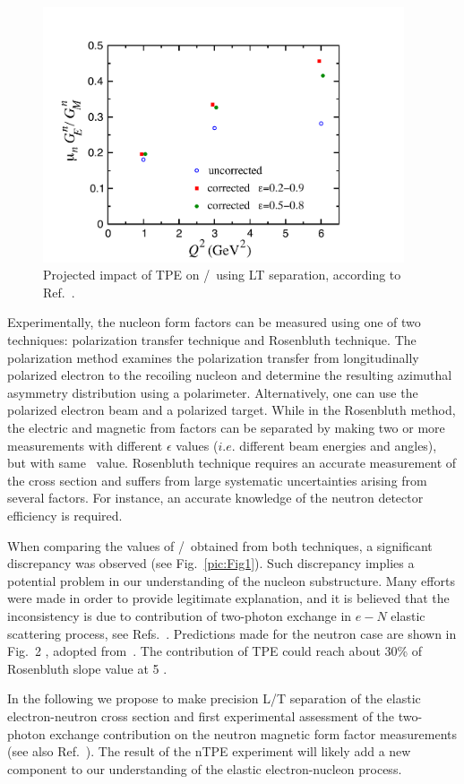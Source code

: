 \begin{figure}[th]
\includegraphics[width = 0.95\textwidth]{Plots/nTPE-BMT.pdf}
\caption{Projected impact of TPE on \gen/\gmn~using LT separation, according to Ref.~\cite{Blunden:2005ew}.}
\label{pic:Fig2}
\end{figure}
 
Experimentally, the nucleon form factors can be measured using one of two techniques: polarization transfer technique and Rosenbluth technique. 
The polarization method examines the polarization transfer from longitudinally polarized electron to the recoiling nucleon and 
determine the resulting azimuthal asymmetry distribution using a polarimeter. 
Alternatively, one can use the polarized  electron beam and a polarized target. 
While in the Rosenbluth method, the electric and magnetic from factors can be separated by making two or more measurements with 
different $\epsilon$ values ($i.e.$ different beam energies and angles), but with same \qsq~value. 
Rosenbluth technique requires an accurate measurement of the cross section and suffers from large systematic uncertainties arising from several factors. 
For instance, an accurate knowledge of the neutron detector efficiency is required.

When comparing the values of \gep/\gmp~obtained from both techniques, a significant discrepancy was observed (see Fig.~\ref{pic:Fig1}). 
Such discrepancy implies a potential problem in our understanding of the nucleon substructure. 
Many efforts were made in order to provide legitimate explanation, and it is believed that the inconsistency is due to contribution of two-photon exchange
in $e-N$ elastic scattering process, see Refs.~\cite{Arrington:2011dn, Afanasev:2017gsk}.
Predictions made for the neutron case are shown in Fig.~2
, adopted from~\cite{Blunden:2005ew}.
The contribution of TPE could reach about 30\% of Rosenbluth slope value at 5 \gevcsq.

In the following we propose to make precision L/T separation of the elastic electron-neutron cross section and first experimental assessment 
of the two-photon exchange contribution on the neutron magnetic form factor measurements (see also Ref.~\cite{Wojtsekhowski:2017kti}).
The result of the nTPE experiment will likely add a new component to our understanding of the elastic electron-nucleon process.
